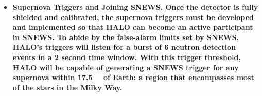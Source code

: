 \begin{itemize}
			\item \bf Supernova Triggers and Joining SNEWS. \rm Once the detector is fully shielded and calibrated, the supernova triggers must be developed and implemented so that HALO can become an active participant in SNEWS. To abide by the false-alarm limits set by SNEWS, HALO's triggers will listen for a burst of 6 neutron detection events in a 2 second time window. With this trigger threshold, HALO will be capable of generating a SNEWS trigger for any supernova within \SI{17.5}{\kilo\parsec} of Earth\cite{Shantz2010}: a region that encompasses most of the stars in the Milky Way.
		\end{itemize}


